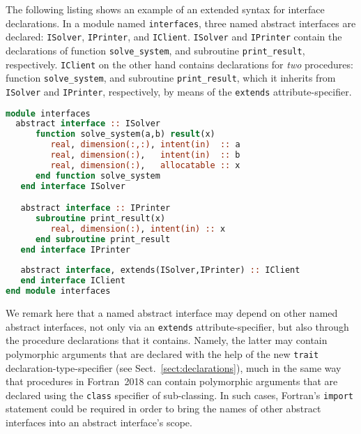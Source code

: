 \documentclass[11pt,oneside]{article}
\begin{document}
The following listing shows an example of an extended syntax for
interface declarations. In a module named \texttt{interfaces}, three
named abstract interfaces are declared: \texttt{ISolver},
\texttt{IPrinter}, and \texttt{IClient}. \texttt{ISolver} and
\texttt{IPrinter} contain the declarations of function
\texttt{solve\_system}, and subroutine \texttt{print\_result},
respectively. \texttt{IClient} on the other hand contains declarations
for \emph{two} procedures: function \texttt{solve\_system}, and
subroutine \texttt{print\_result}, which it inherits from
\texttt{ISolver} and \texttt{IPrinter}, respectively, by means of the
\texttt{extends} attribute-specifier.

\newpage

\begin{lstlisting}[language=Fortran]
module interfaces
  abstract interface :: ISolver
      function solve_system(a,b) result(x)
         real, dimension(:,:), intent(in)  :: a
         real, dimension(:),   intent(in)  :: b
         real, dimension(:),   allocatable :: x
      end function solve_system
   end interface ISolver

   abstract interface :: IPrinter
      subroutine print_result(x)
         real, dimension(:), intent(in) :: x
      end subroutine print_result
   end interface IPrinter
   
   abstract interface, extends(ISolver,IPrinter) :: IClient
   end interface IClient
end module interfaces
\end{lstlisting}
\label{list:interface}
We remark here that a named abstract interface may depend on other
named abstract interfaces, not only via an \texttt{extends}
attribute-specifier, but also through the procedure declarations that
it contains. Namely, the latter may contain polymorphic arguments that
are declared with the help of the new \texttt{trait}
declaration-type-specifier (see Sect.~\ref{sect:declarations}), much
in the same way that procedures in Fortran~2018 can contain
polymorphic arguments that are declared using the \texttt{class}
specifier of sub-classing. In such cases, Fortran's \texttt{import}
statement could be required in order to bring the names of other
abstract interfaces into an abstract interface's scope.
\end{document}
